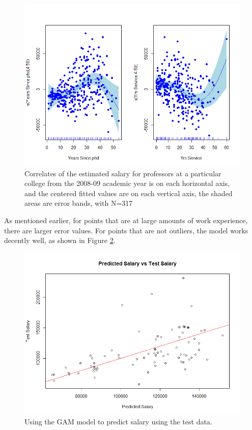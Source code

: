\documentclass{article}
\begin{document}
\newpage

\begin{figure}
    \centering
    \includegraphics[scale=0.5]{gamPlot}
    \caption{Correlates of the estimated salary for professors at a particular college from the 2008-09 academic year is on each horizontal axis, and the centered fitted values are on each vertical axis, the shaded areas are error bands, with N=317}
    \label{gamplot}
\end{figure}

As mentioned earlier, for points that are at large amounts of work experience, there are larger error values. For points that are not outliers, the model works decently well, as shown in Figure \ref{predict}.

\begin{figure}[!htb]
    \centering
    \includegraphics[scale=0.5]{predict}
    \caption{Using the GAM model to predict salary using the test data.}
    \label{predict}
\end{figure}
\end{document}
